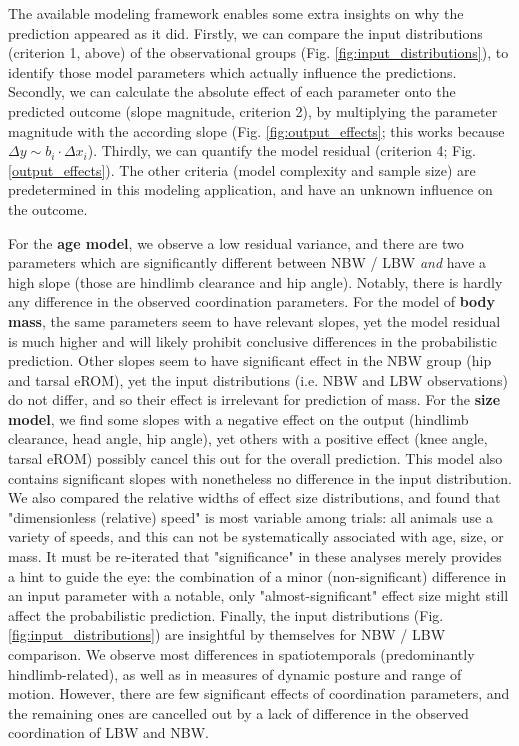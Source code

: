 \begin{change}
The available modeling framework enables some extra insights on why the prediction appeared as it did.
Firstly, we can compare the input distributions (criterion 1, above) of the observational groups (Fig. \ref{fig:input_distributions}), to identify those model parameters which actually influence the predictions.
Secondly, we can calculate the absolute effect of each parameter onto the predicted outcome (slope magnitude, criterion 2), by multiplying the parameter magnitude with the according slope (Fig. \ref{fig:output_effects}; this works because \(\Delta y \sim b_i \cdot \Delta x_i\)).
Thirdly, we can quantify the model residual (criterion 4; Fig. \ref{output_effects}).
The other criteria (model complexity and sample size) are predetermined in this modeling application, and have an unknown influence on the outcome.

For the \textbf{age model}, we observe a low residual variance, and there are two parameters which are significantly different between NBW / LBW \textit{and} have a high slope (those are hindlimb clearance and hip angle).
Notably, there is hardly any difference in the observed coordination parameters.
For the model of \textbf{body mass}, the same parameters seem to have relevant slopes, yet the model residual is much higher and will likely prohibit conclusive differences in the probabilistic prediction.
Other slopes seem to have significant effect in the NBW group (hip and tarsal eROM), yet the input distributions (i.e. NBW and LBW observations) do not differ, and so their effect is irrelevant for prediction of mass.
For the \textbf{size model}, we find some slopes with a negative effect on the output (hindlimb clearance, head angle, hip angle), yet others with a positive effect (knee angle, tarsal eROM) possibly cancel this out for the overall prediction.
This model also contains significant slopes with nonetheless no difference in the input distribution.
We also compared the relative widths of effect size distributions, and found that "dimensionless (relative) speed" is most variable among trials: all animals use a variety of speeds, and this can not be systematically associated with age, size, or mass.
It must be re-iterated that "significance" in these analyses merely provides a hint to guide the eye: the combination of a minor (non-significant) difference in an input parameter with a notable, only "almost-significant" effect size might still affect the probabilistic prediction.
Finally, the input distributions (Fig. \ref{fig:input_distributions}) are insightful by themselves for NBW / LBW comparison.
We observe most differences in spatiotemporals (predominantly hindlimb-related), as well as in measures of dynamic posture and range of motion.
However, there are few significant effects of coordination parameters, and the remaining ones are cancelled out by a lack of difference in the observed coordination of LBW and NBW.



\end{change}
